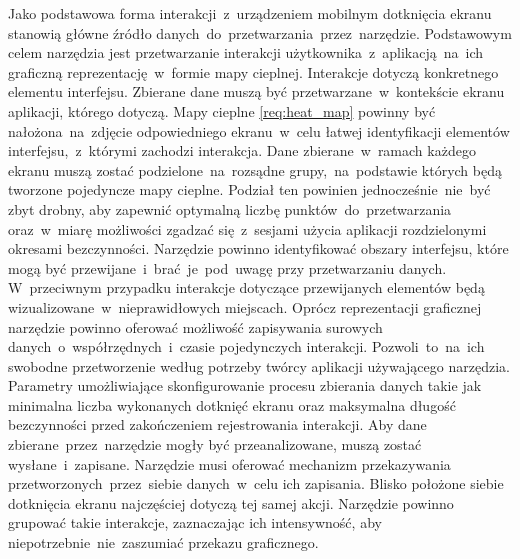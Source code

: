 \begin{enumerate}[label=\textbf{F.\arabic*}]
	 Jako podstawowa forma interakcji~z~urządzeniem mobilnym dotknięcia ekranu stanowią główne źródło danych~do~przetwarzania~przez~narzędzie.
	 Podstawowym celem narzędzia jest przetwarzanie interakcji użytkownika~z~aplikacją~na~ich graficzną reprezentację~w~formie mapy cieplnej. 
	 Interakcje dotyczą konkretnego elementu interfejsu. Zbierane dane muszą być przetwarzane~w~kontekście ekranu aplikacji, którego dotyczą. Mapy cieplne \ref{req:heat_map} powinny być nałożona~na~zdjęcie odpowiedniego ekranu~w~celu łatwej identyfikacji elementów interfejsu,~z~którymi zachodzi interakcja.
	 Dane zbierane~w~ramach każdego ekranu muszą zostać podzielone~na~rozsądne grupy,~na~podstawie których będą tworzone pojedyncze mapy cieplne. Podział ten powinien jednocześnie~nie~być zbyt drobny, aby zapewnić optymalną liczbę punktów~do~przetwarzania oraz~w~miarę możliwości zgadzać się~z~sesjami użycia aplikacji rozdzielonymi okresami bezczynności.
	 Narzędzie powinno identyfikować obszary interfejsu, które mogą być przewijane~i~brać~je~pod~uwagę przy przetwarzaniu danych. W~przeciwnym przypadku interakcje dotyczące przewijanych elementów będą wizualizowane~w~nieprawidłowych miejscach.
	 Oprócz reprezentacji graficznej narzędzie powinno oferować możliwość zapisywania surowych danych~o~współrzędnych~i~czasie pojedynczych interakcji. Pozwoli~to~na~ich swobodne przetworzenie według potrzeby twórcy aplikacji używającego narzędzia.
	 Parametry umożliwiające skonfigurowanie procesu zbierania danych takie jak minimalna liczba wykonanych dotknięć ekranu oraz maksymalna długość bezczynności przed zakończeniem rejestrowania interakcji.
	 Aby dane zbierane~przez~narzędzie mogły być przeanalizowane, muszą zostać wysłane~i~zapisane. Narzędzie musi oferować mechanizm przekazywania przetworzonych~przez~siebie danych~w~celu ich zapisania.
	 Blisko położone siebie dotknięcia ekranu najczęściej dotyczą tej samej akcji. Narzędzie powinno grupować takie interakcje, zaznaczając ich intensywność, aby niepotrzebnie~nie~zaszumiać przekazu graficznego.

\end{enumerate}
